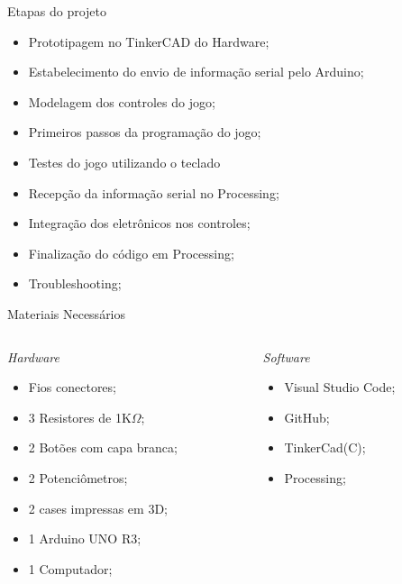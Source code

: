 \begin{frame}[t]{Etapas do projeto}
   
 \vspace{0.3cm}
	\begin{itemize}
		\item Prototipagem no TinkerCAD do Hardware;
		\item Estabelecimento do envio de informação serial pelo Arduino;
		\item Modelagem dos controles do jogo;
		\item Primeiros passos da programação do jogo;
		\item Testes do jogo utilizando o teclado
		\item Recepção da informação serial no Processing;
		\item Integração dos eletrônicos nos controles;
		\item Finalização do código em Processing;
		\item Troubleshooting;
	\end{itemize}
 
\end{frame}
\begin{frame}[t]{Materiais Necessários}

\begin{columns}
	\begin{column}{0.5\textwidth}
        	\emph {Hardware}
		\begin{itemize}
			\item Fios conectores;
			\item 3 Resistores de 1K$\Omega$;
			\item 2 Botões com capa branca;
			\item 2 Potenciômetros;
			\item 2 cases impressas em 3D;
			\item 1 Arduino UNO R3;
			\item 1 Computador;
		\end{itemize}
	\end{column}
	\begin{column}{0.5\textwidth}
   		\emph {Software}
		\begin{itemize}
			\item Visual Studio Code;
			\item GitHub;
			\item TinkerCad(C);
			\item Processing; 
		\end{itemize}
	\end{column}
\end{columns}

\end{frame}
